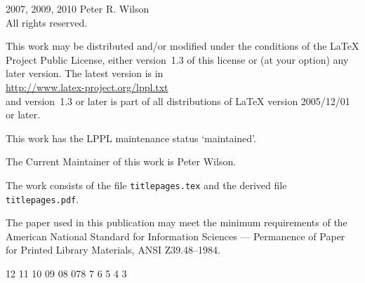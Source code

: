\begingroup
\footnotesize
\parindent 0pt
\parskip \baselineskip
\textcopyright{} 2007, 2009, 2010 Peter R. Wilson \\
All rights reserved.

This work may be distributed and/or modified under the conditions
of the LaTeX Project Public License, either version~1.3 of this license
or (at your option) any later version. The latest version is in \\
\hspace*{2em} \url{http://www.latex-project.org/lppl.txt} \\
and version~1.3 or later is part of all distributions of LaTeX
version 2005/12/01 or later.

This work has the LPPL maintenance status `maintained'.

The Current Maintainer of this work is Peter Wilson.

The work consists of the file \texttt{titlepages.tex} and the
derived file \texttt{titlepages.pdf}.

\begin{comment}
This material may be distributed only subject to the terms and conditions
set forth in the Open Publication License v1.0 or later (the latest
version is presently available at \url{http://www.opencontent.org/openpub/}).
Distribution of substantively modified versions of this document is
prohibited without the explicit permission of the copyright holder.
Distribution of the work or derivative of the work in any standard
(paper) book form is prohibited unless prior permission is obtained
from the copyright holder.


The procedures and applications presented in this work have been
included for their instructional value. They have been tested 
with care but are not guaranteed for any particular purpose.
The publisher does not offer any warranties or representations,
nor does it accept any liabilities with respect to the 
programs or applications.
\end{comment}

The paper used in this publication may meet the minimum 
requirements of the American National Standard for 
Information Sciences --- Permanence of Paper for Printed
Library Materials, ANSI Z39.48--1984.

\begin{center}
	12 11 10 09 08 07\hspace{2em}8 7 6 5 4 3 %
\end{center}

